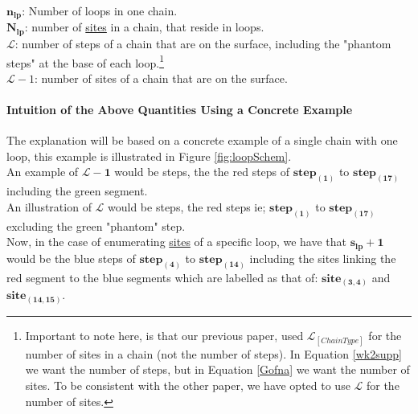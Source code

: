 \documentclass[12pt,letterpaper]{article}
\newcommand{\leng}{\mathcal{L}}
\begin{document}
$
\boldsymbol{
n_{lp}
}
$: 
Number of loops in one chain.\\

$
\boldsymbol{
    N_{lp}
}
$: 
number of \underline{sites} in a chain, that reside in loops.\\

$\leng$: number of steps of a chain that are on the surface, including the "phantom steps" at the base of each loop.\footnote{Important to note here, is that our previous paper, used $\leng_{[ChainType]}$ for the number of sites in a chain (not the number of steps).  In Equation \ref{wk2supp} we want the number of steps, but in Equation \ref{Gofna} we want the number of sites. To be consistent with the other paper, we have opted to use $\leng$ for the number of sites.}\\

$\leng-1$: number of sites of a chain that are on the surface.\\




\paragraph{Intuition of the Above Quantities Using a Concrete Example} The explanation will be based on a concrete example of a single chain with one loop, this example is illustrated in Figure \ref{fig:loopSchem}.\\

An example of 
$
\boldsymbol{
\leng-1
}
$ 
would be steps, the the red steps of 
$
\boldsymbol{
step_{(1)}
}
$ 
to 
$
\boldsymbol{
step_{(17)}
}
$ 
including the green segment.\\

An illustration of $\boldsymbol{\leng}$ would be steps, the red steps ie; 
$
\boldsymbol{
step_{(1)}
}
$ 
to 
$
\boldsymbol{
step_{(17)}
}
$ 
excluding the green "phantom" step.\\

Now, in the case of enumerating \underline{sites} of a specific loop, we have that
$
\boldsymbol{
    s_{lp}
    +
    1
}
$
would be the blue steps of 
$
\boldsymbol{
step_{(4)}
}
$ 
to 
$
\boldsymbol{
step_{(14)}
}
$ 
including the sites linking the red segment to the blue segments which are labelled as that of: 
$
\boldsymbol{
site_{(3,4)}
}
$ 
and 
$
\boldsymbol{
site_{(14,15)}
}
$.\\
\end{document}
